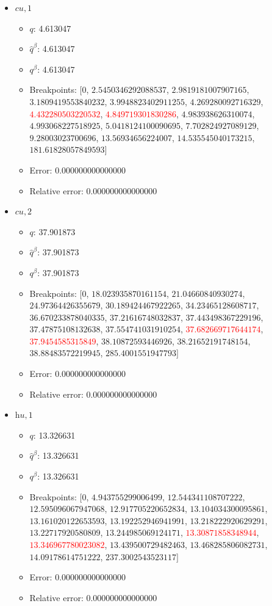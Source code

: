 \documentclass{article}%
\begin{document}
\begin{itemize}
\begin{itemize}
		\item Error: 0.000000000000000%
		\item Relative error: 0.000000000000000%
	\end{itemize}%
	\item $\textit{cu},1$%
	\begin{itemize}%
		\item $q$: 4.613047%
		\item $\hat{q}^\beta$: 4.613047%
		\item $q^\beta$: 4.613047%
		\item Breakpoints: $[$$0$, $2.5450346292088537$, $2.9819181007907165$, $3.1809419553840232$, $3.9948823402911255$, $4.269280092716329$, \textcolor{red}{$4.432280503220532$}, \textcolor{red}{$4.849719301830286$}, $4.983938626310074$, $4.993068227518925$, $5.0418124100090695$, $7.702824927089129$, $9.28003023700696$, $13.56934656224007$, $14.535545040173215$, $181.61828057849593$$]$%
		\item Error: 0.000000000000000%
		\item Relative error: 0.000000000000000%
	\end{itemize}%
	\item $\textit{cu},2$%
	\begin{itemize}%
		\item $q$: 37.901873%
		\item $\hat{q}^\beta$: 37.901873%
		\item $q^\beta$: 37.901873%
		\item Breakpoints: $[$$0$, $18.023935870161154$, $21.04660840930274$, $24.97364426355679$, $30.189424467922265$, $34.23465128608717$, $36.670233878040335$, $37.21616748032837$, $37.443498367229196$, $37.47875108132638$, $37.554741031910254$, \textcolor{red}{$37.682669717644174$}, \textcolor{red}{$37.9454585315849$}, $38.10872593446926$, $38.21652191748154$, $38.88483572219945$, $285.4001551947793$$]$%
		\item Error: 0.000000000000000%
		\item Relative error: 0.000000000000000%
	\end{itemize}%
	\item $\textit{hu},1$%
	\begin{itemize}%
		\item $q$: 13.326631%
		\item $\hat{q}^\beta$: 13.326631%
		\item $q^\beta$: 13.326631%
		\item Breakpoints: $[$$0$, $4.943755299006499$, $12.544341108707222$, $12.595096067947068$, $12.917705220652834$, $13.104034300095861$, $13.161020122653593$, $13.192252946941991$, $13.218222920629291$, $13.22717920580809$, $13.244985069124171$, \textcolor{red}{$13.30871858348944$}, \textcolor{red}{$13.346967780023082$}, $13.439500729482463$, $13.468285806082731$, $14.09178614751222$, $237.3002543523117$$]$%
		\item Error: 0.000000000000000%
		\item Relative error: 0.000000000000000%
	\end{itemize}%
\end{itemize}%
\end{document}
